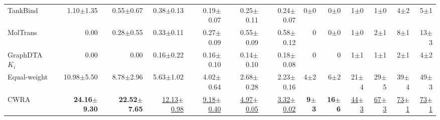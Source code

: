 \begin{table}[htbp!]
\begin{tabular}{lrrrrrr|rrrrrr}
TankBind & 1.10$\pm$1.35 & 0.55$\pm$0.67 & 0.38$\pm$0.13 & 0.19$\pm$0.07 & 0.25$\pm$0.11 & 0.24$\pm$0.07 & 0$\pm$0 & 0$\pm$0 & 1$\pm$0 & 1$\pm$0 & 4$\pm$2 & 5$\pm$1 \\
MolTrans & 0.00 & 0.28$\pm$0.55 & 0.33$\pm$0.11 & 0.27$\pm$0.09 & 0.55$\pm$0.09 & 0.58$\pm$0.12 & 0 & 0$\pm$0 & 1$\pm$0 & 2$\pm$1 & 8$\pm$1 & 13$\pm$3 \\
GraphDTA $K_{i}$ & 0.00 & 0.00 & 0.16$\pm$0.22 & 0.16$\pm$0.10 & 0.14$\pm$0.10 & 0.18$\pm$0.08 & 0 & 0 & 1$\pm$1 & 1$\pm$1 & 2$\pm$1 & 4$\pm$2 \\
\midrule
Equal-weight & 10.98$\pm$5.50 & 8.78$\pm$2.96 & 5.63$\pm$1.02 & 4.02$\pm$0.64 & 2.68$\pm$0.28 & 2.23$\pm$0.16 & 4$\pm$2 & 6$\pm$2 & 21$\pm$4 & 29$\pm$5 & 39$\pm$4 & 49$\pm$3 \\
CWRA & \textbf{24.16$\pm$9.30} & \textbf{22.52$\pm$7.65} & \underline{12.13$\pm$0.98} & \underline{9.18$\pm$0.40} & \underline{4.97$\pm$0.05} & \underline{3.32$\pm$0.02} & \textbf{9$\pm$3} & \textbf{16$\pm$6} & \underline{44$\pm$3} & \underline{67$\pm$3} & \underline{73$\pm$1} & \underline{73$\pm$1} \\
\bottomrule
\end{tabular}
\end{table}